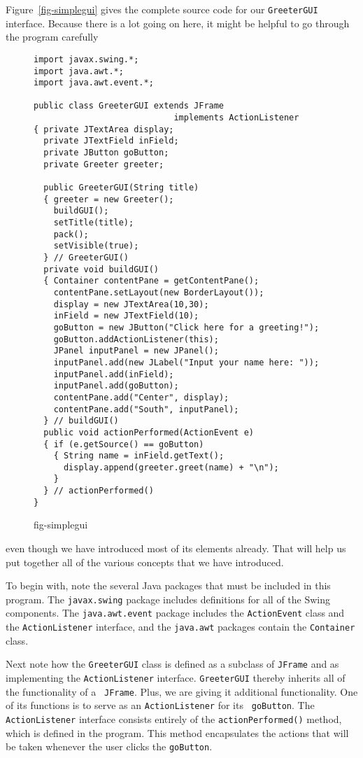 Figure~\ref{fig-simplegui} gives the complete source code
for our {\tt GreeterGUI} interface. Because there is a lot going
on here, it might be helpful to go through the program carefully
\begin{figure}[h!]
\jjjprogstart
\begin{jjjlisting}
\begin{lstlisting}
import javax.swing.*;
import java.awt.*;
import java.awt.event.*;

public class GreeterGUI extends JFrame 
                            implements ActionListener 
{ private JTextArea display;
  private JTextField inField;
  private JButton goButton;
  private Greeter greeter;
	    
  public GreeterGUI(String title) 
  { greeter = new Greeter();  
    buildGUI();
    setTitle(title);
    pack();
    setVisible(true);
  } // GreeterGUI()
  private void buildGUI() 
  { Container contentPane = getContentPane();
    contentPane.setLayout(new BorderLayout());
    display = new JTextArea(10,30);
    inField = new JTextField(10);
    goButton = new JButton("Click here for a greeting!");
    goButton.addActionListener(this);
    JPanel inputPanel = new JPanel();
    inputPanel.add(new JLabel("Input your name here: "));
    inputPanel.add(inField);
    inputPanel.add(goButton);
    contentPane.add("Center", display);
    contentPane.add("South", inputPanel);
  } // buildGUI()
  public void actionPerformed(ActionEvent e) 
  { if (e.getSource() == goButton) 
    { String name = inField.getText();
      display.append(greeter.greet(name) + "\n");
    }
  } // actionPerformed()
}
\end{lstlisting}
\end{jjjlisting}
{fig-simplegui}
\end{figure}
even though we have introduced most of its elements already. That
will help us put  together all of the various concepts that
we have introduced.

To begin with, note the several Java packages that must be included in
this program. The {\tt javax.swing} package includes definitions for
all of the Swing components. The {\tt java.awt.event} package includes
the {\tt ActionEvent} class and the {\tt ActionListener} interface,
and the {\tt java.awt} packages contain the {\tt Container} class.

Next note how the {\tt GreeterGUI} class is defined as a subclass of
{\tt JFrame} and as implementing the {\tt ActionListener} interface.
{\tt GreeterGUI} thereby inherits all of the functionality of a {\tt
JFrame}.  Plus, we are giving it additional functionality. One of its
functions is to serve as an {\tt ActionListener} for its {\tt
goButton}.  The {\tt ActionListener} interface consists entirely of
the {\tt actionPerformed()} method, which is defined in the program.
This method encapsulates the actions that will be taken whenever the
user clicks the {\tt goButton}.

